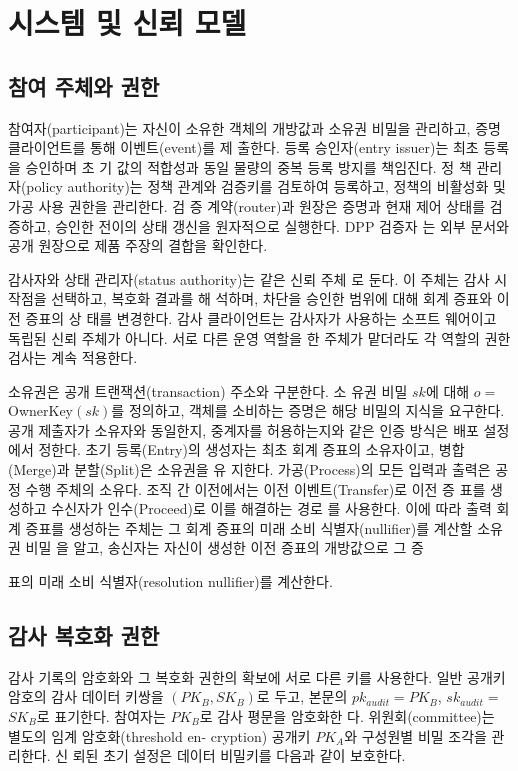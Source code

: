 \section{시스템 및 신뢰 모델}

\subsection{참여 주체와 권한}
참여자(participant)는 자신이 소유한 객체의 개방값과 소유권
비밀을 관리하고, 증명 클라이언트를 통해 이벤트(event)를 제
출한다. 등록 승인자(entry issuer)는 최초 등록을 승인하며 초
기 값의 적합성과 동일 물량의 중복 등록 방지를 책임진다. 정
책 관리자(policy authority)는 정책 관계와 검증키를 검토하여
등록하고, 정책의 비활성화 및 가공 사용 권한을 관리한다. 검
증 계약(router)과 원장은 증명과 현재 제어 상태를 검증하고,
승인한 전이의 상태 갱신을 원자적으로 실행한다. DPP 검증자
는 외부 문서와 공개 원장으로 제품 주장의 결합을 확인한다.

감사자와 상태 관리자(status authority)는 같은 신뢰 주체
로 둔다. 이 주체는 감사 시작점을 선택하고, 복호화 결과를 해
석하며, 차단을 승인한 범위에 대해 회계 증표와 이전 증표의 상
태를 변경한다. 감사 클라이언트는 감사자가 사용하는 소프트
웨어이고 독립된 신뢰 주체가 아니다. 서로 다른 운영 역할을
한 주체가 맡더라도 각 역할의 권한 검사는 계속 적용한다.

소유권은 공개 트랜잭션(transaction) 주소와 구분한다. 소
유권 비밀 \(sk\)에 대해 \(o=\) OwnerKey\((sk)\)를 정의하고, 객체를
소비하는 증명은 해당 비밀의 지식을 요구한다. 공개 제출자가
소유자와 동일한지, 중계자를 허용하는지와 같은 인증 방식은
배포 설정에서 정한다. 초기 등록(Entry)의 생성자는 최초 회계
증표의 소유자이고, 병합(Merge)과 분할(Split)은 소유권을 유
지한다. 가공(Process)의 모든 입력과 출력은 공정 수행 주체의
소유다. 조직 간 이전에서는 이전 이벤트(Transfer)로 이전 증
표를 생성하고 수신자가 인수(Proceed)로 이를 해결하는 경로
를 사용한다. 이에 따라 출력 회계 증표를 생성하는 주체는 그
회계 증표의 미래 소비 식별자(nullifier)를 계산할 소유권 비밀
을 알고, 송신자는 자신이 생성한 이전 증표의 개방값으로 그 증

표의 미래 소비 식별자(resolution nullifier)를 계산한다.

\subsection{감사 복호화 권한}
감사 기록의 암호화와 그 복호화 권한의 확보에 서로 다른
키를 사용한다. 일반 공개키 암호의 감사 데이터 키쌍을
\((PK_{B},SK_{B})\)로 두고, 본문의 \(pk_{audit}=PK_{B}\), \(sk_{audit}=\)
\(SK_{B}\)로 표기한다. 참여자는 \(PK_{B}\)로 감사 평문을 암호화한
다. 위원회(committee)는 별도의 임계 암호화(threshold en-
cryption) 공개키 \(PK_{A}\)와 구성원별 비밀 조각을 관리한다. 신
뢰된 초기 설정은 데이터 비밀키를 다음과 같이 보호한다.

